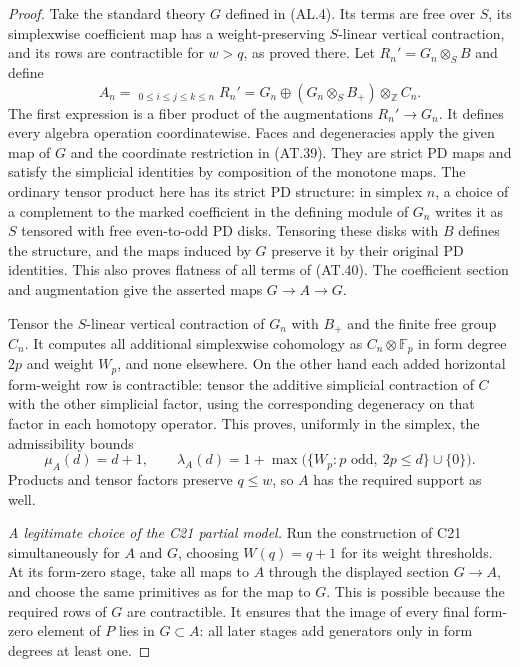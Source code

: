 \begin{proof}
Take the standard theory $G$ defined in
\textup{(AL.4)}.  Its terms are free over $S$, its
simplexwise coefficient map has a weight-preserving
$S$-linear vertical contraction, and its rows are
contractible for $w>q$, as proved there.
Let $R_n'=G_n\otimes_S B$ and define
\[
 A_n=\mathop{\prod\nolimits_{G_n}}_{0\leq i\leq j\leq k\leq n}
       R_n'
   =G_n\oplus(G_n\otimes_S B_+)\otimes_{\mathbb Z}C_n.
 \tag{AT.40}
\]
The first expression is a fiber product of the
augmentations $R_n'\to G_n$.
It defines every algebra operation coordinatewise.
Faces and degeneracies apply the given map of $G$
and the coordinate restriction in \textup{(AT.39)}.
They are strict PD maps and satisfy the simplicial
identities by composition of the monotone maps.
The ordinary tensor product here has its strict PD
structure: in simplex $n$, a choice of a complement
to the marked coefficient in the defining module of
$G_n$ writes it as $S$ tensored with free even-to-odd
PD disks.  Tensoring these disks with $B$ defines
the structure, and the maps induced by $G$ preserve
it by their original PD identities.  This also
proves flatness of all terms of \textup{(AT.40)}.
The coefficient section and augmentation give the
asserted maps $G\to A\to G$.

Tensor the $S$-linear vertical contraction of $G_n$
with $B_+$ and the finite free group $C_n$.
It computes all additional simplexwise cohomology
as $C_n\otimes\mathbb F_p$ in form degree $2p$
and weight $W_p$, and none elsewhere.
On the other hand each added horizontal form-weight
row is contractible: tensor the additive simplicial
contraction of $C$ with the other simplicial factor,
using the corresponding degeneracy on that factor
in each homotopy operator.  This proves, uniformly
in the simplex, the admissibility bounds
\[
 \mu_A(d)=d+1,\qquad
 \lambda_A(d)=1+\max\bigl(\{W_p: p\text{ odd},\ 2p\leq d\}
                                      \cup\{0\}\bigr).
 \tag{AT.41}
\]
Products and tensor factors preserve $q\leq w$,
so $A$ has the required support as well.

\emph{A legitimate choice of the C21 partial model.}
Run the construction of C21 simultaneously for
$A$ and $G$, choosing $W(q)=q+1$ for its weight
thresholds.  At its form-zero stage, take all
maps to $A$ through the displayed section $G\to A$,
and choose the same primitives as for the map to
$G$.  This is possible because the required rows
of $G$ are contractible.  It ensures that the image
of every final form-zero element of $P$ lies in
$G\subset A$: all later stages add generators only
in form degrees at least one.


\end{proof}
